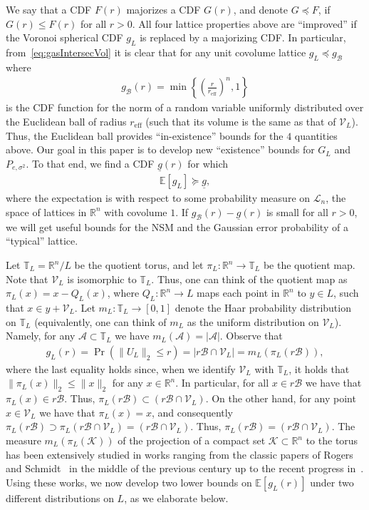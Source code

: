 \documentclass[article,doublecolumn]{IEEEtran}
\newcommand{\EE}{{\mathbb{E}}}
\newcommand{\LL}{{\mathcal L}}
\newcommand{\R}{{\mathbb{R}}}
\newcommand{\TT}{{\mathbb{T}}}
\newcommand{\A}{{\mathcal{A}}}
\newcommand{\KK}{{\mathcal{K}}}
\newcommand{\mVL}{{\mathcal{V}_L}}
\newcommand{\mBeuc}{{\mathcal{B}}}
\newcommand{\reff}{{r_{\mathrm{eff}}}}
\newcommand{\VcdfL}{g_L}
\newcommand{\VcdfLB}{\underline{g}}
\newcommand{\VcdfB}{g_{\mathcal{B}}}
\newcommand{\Pesig}{P_{e,\sigma^2}}
\begin{document}
We say that a CDF $F(r)$ majorizes a CDF $G(r)$, and denote $G\preceq F$, if $G(r)\leq F(r)$ for all $r>0$. 
All four lattice properties above are ``improved'' if the Voronoi spherical CDF $\VcdfL$ is replaced by a majorizing CDF. In particular, from~\eqref{eq:gasIntersecVol} it is clear that for any unit covolume lattice $\VcdfL \preceq \VcdfB$ where
\begin{align}
\VcdfB(r)=\min\left\{\left(\frac{r}{\reff}\right)^n,1 \right\}
\label{eq:gBall}
\end{align}
is the CDF function for the norm of a random variable uniformly distributed over the Euclidean ball of radius $\reff$ (such that its volume is the same as that of $\mVL$). Thus, the Euclidean ball provides ``in-existence'' bounds for the $4$ quantities above. Our goal in this paper is to develop new ``existence'' bounds for $G_L$ and $\Pesig$. To that end, we find a CDF $\VcdfLB(r)$ for which
\begin{align}
\mathbb{E}[\VcdfL]\succeq \VcdfLB,    
\end{align}
where the expectation is with respect to some probability measure on $\LL_n$, the space of lattices in $\R^n$ with covolume $1$. If $\VcdfB(r)-\VcdfLB(r)$ is small for all $r>0$, we will get useful bounds for the NSM and the Gaussian error probability of a ``typical'' lattice.

\medskip

Let $\TT_L=\R^n/L$ be the quotient torus, and let $\pi_{L}:\R^n\to\TT_{L}$ be the quotient map.  Note that $\mVL$ is isomorphic to $\TT_L$. Thus, one can think of the quotient map as $\pi_L(x)=x-Q_L(x)$, where $Q_L:\R^n\to L$ maps each point in $\R^n$ to $y\in L$, such that $x\in y+\mVL$. Let $m_{L}:\TT_L\to[0,1]$ denote the Haar probability distribution on $\TT_L$ (equivalently, one can think of $m_L$ as the uniform distribution on $\mVL$). Namely, for any $\mathcal{A}\subset\TT_L$ we have $m_{L}(\mathcal{A})=|\A|$.
Observe that 
\begin{align}
\VcdfL(r)=\Pr(\|U_L\|_2\leq r)=|r\mBeuc\cap \mVL| =m_{L}(\pi_{L}(r\mBeuc)),   
\label{eq:RprojgC}
\end{align}
where the last equality holds since, when we identify $\mVL$ with $\TT_L$, it holds that $\|\pi_{L}(x)\|_2\leq \|x\|_2$ for any $x\in\R^n$. In particular, for all $x\in r\mBeuc$ we have that $\pi_{L}(x)\in r\mBeuc$. Thus, $\pi_{L}(r\mBeuc)\subset ( r\mBeuc\cap \mVL)$. On the other hand, for any point $x\in\mVL$ we have that $\pi_L(x)=x$, and consequently $\pi_{L}(r\mBeuc)\supset\pi_{L}(r\mBeuc\cap \mVL)=(r\mBeuc\cap \mVL)$. Thus, $\pi_{L}(r\mBeuc)=(r\mBeuc\cap \mVL)$. The measure $m_{L}(\pi_{L}(\KK))$ of the projection of a compact set $\KK\subset\R^n$ to the torus has been extensively studied in works ranging from the classic papers of Rogers~\cite{Rogers_bound} and Schmidt~\cite{Schmidt-admissible} in the middle of the previous century up to the recent progress in~\cite{ORW21,ORW23}. Using these works, we now develop two lower bounds on $\EE[\VcdfL(r)]$ under two different distributions on $L$, as we elaborate below.
\end{document}
